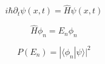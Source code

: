 \[
i\hbar \partial_t \psi(x,t)=\hat H\psi(x,t)
\]

\[
\hat H\phi_n = E_n \phi_n
\]

\[
P(E_n)=|\langle \phi_n|\psi\rangle|^2
\]
